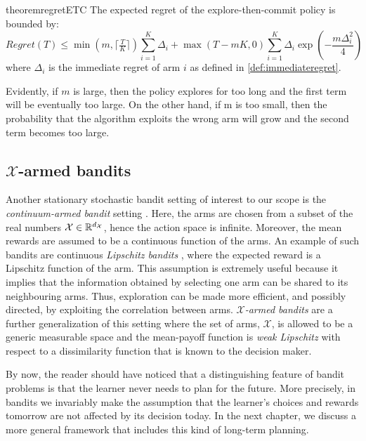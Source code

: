 \begin{restatable}{theorem}{regretETC}\label{th:regretETC}\cite{lattimore2019bandit}
The expected regret of the explore-then-commit policy is bounded by:
\begin{equation}
Regret(T) \leq \min\left(m, \lceil\tfrac{T}{K}\rceil\right)\sum_{i=1}^{K}\Delta_i+\max\left(T-mK, 0\right)\sum_{i=1}^{K}\Delta_i\exp\left(-\frac{m\Delta_i^2}{4}\right)
\end{equation}
where $\Delta_i$ is the immediate regret of arm $i$ as defined in \ref{def:immediateregret}.
\end{restatable}

Evidently, if $m$ is large, then the policy explores for too long and the first term will be eventually too large.
On the other hand, if m is too small, then the probability that the algorithm exploits the wrong arm will grow and the second term becomes too large.

\subsection{$\mathcal{X}$-armed bandits}
Another stationary stochastic bandit setting of interest to our scope is the \emph{continuum-armed bandit} setting \cite{agrawal1995continuum}. Here, the arms are chosen from a subset of the real numbers $\mathcal{X}\in\mathbb{R}^{d_{\mathcal{X}}} $, hence the action space is infinite. Moreover, the mean rewards are assumed to be a continuous function of the arms. An example of such bandits are continuous \emph{Lipschitz bandits} \cite{magureanu2014lipschitz}, where the expected reward is a Lipschitz function of the arm. This assumption is extremely useful because it implies that the information obtained by selecting one arm can be shared to its neighbouring arms. Thus, exploration can be made more efficient, and possibly directed, by exploiting the correlation between arms. \emph{$\mathcal{X}$-armed bandits} \cite{bubeck2011x} are a further generalization of this setting where the set of arms, $\mathcal{X}$, is allowed to be a generic measurable space and the mean-payoff function is \emph{weak Lipschitz} with respect to a dissimilarity function that is known to the decision maker.


By now, the reader should have noticed that a distinguishing feature of bandit problems is that the learner never needs to plan for the future. More precisely, in bandits we invariably make the assumption that the learner’s choices and rewards tomorrow are not affected by its decision today. In the next chapter, we discuss a more general framework that includes this kind of long-term planning.

